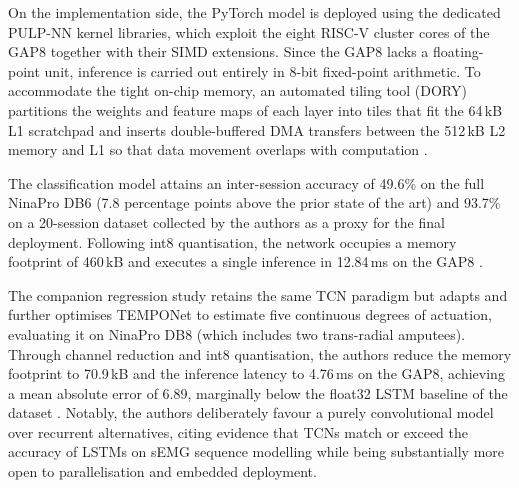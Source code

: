\documentclass[12pt,DIV16,BCOR12mm,a4paper,footinclude=false,headinclude,parskip=half-,twoside,openright,cleardoublepage=empty,toc=index,bibliography=totoc,listof=totoc]{scrreprt}
\numberwithin{equation}{chapter}
\begin{document}
      On the implementation side, the PyTorch model is deployed using the dedicated PULP-NN kernel libraries, which
      exploit the eight RISC-V cluster cores of the GAP8 together with their SIMD extensions. Since the GAP8 lacks a
      floating-point unit, inference is carried out entirely in 8-bit fixed-point arithmetic. To accommodate the
      tight on-chip memory, an automated tiling tool (DORY) partitions the weights and feature maps of each layer
      into tiles that fit the 64\,kB L1 scratchpad and inserts double-buffered DMA transfers between the 512\,kB L2
      memory and L1 so that data movement overlaps with computation \cite{zanghieriRobustRealTimeEmbedded2020}.

      The classification model attains an inter-session accuracy of 49.6\% on the full NinaPro DB6 (7.8 percentage
      points above the prior state of the art) and 93.7\% on a 20-session dataset collected by the authors as a
      proxy for the final deployment. Following int8 quantisation, the network occupies a memory footprint of
      460\,kB and executes a single inference in 12.84\,ms on the GAP8 \cite{zanghieriRobustRealTimeEmbedded2020}.

      The companion regression study \cite{zanghieriSEMGbasedRegressionHand2021} retains the same TCN paradigm but
      adapts and further optimises TEMPONet to estimate five continuous degrees of actuation, evaluating it on
      NinaPro DB8 (which includes two trans-radial amputees). Through channel reduction and int8 quantisation, the
      authors reduce the memory footprint to 70.9\,kB and the inference latency to 4.76\,ms on the GAP8, achieving a
      mean absolute error of 6.89\textdegree, marginally below the float32 LSTM baseline of the dataset
      \cite{zanghieriSEMGbasedRegressionHand2021}. Notably, the authors deliberately favour a purely convolutional
      model over recurrent alternatives, citing evidence that TCNs match or exceed the accuracy of LSTMs on sEMG
      sequence modelling while being substantially more open to parallelisation and embedded deployment.
\end{document}
